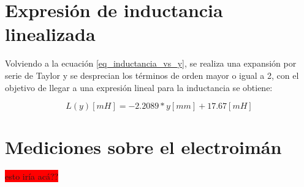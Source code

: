 \section{Expresión de inductancia linealizada}

\noindent Volviendo a la ecuación \ref{eq_inductancia_vs_y}, se realiza una expansión por serie de Taylor y se desprecian los términos de orden mayor o igual a 2, con el objetivo de llegar a una expresión lineal para la inductancia se obtiene:

\begin{equation} \label{eq_inductancia_lineal_teorica}
	L(y)[mH]=-2.2089*y[mm]+17.67 [mH]
\end{equation}

\section{Mediciones sobre el electroimán}

\colorbox{red}{esto iría acá??}

